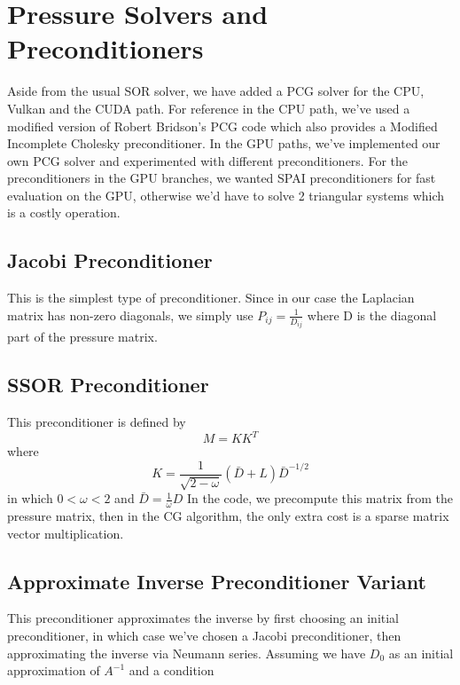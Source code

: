 \documentclass{article}
\begin{document}
\section{Pressure Solvers and Preconditioners}
Aside from the usual SOR solver, we have added a PCG solver for the CPU, Vulkan and the CUDA path. For reference in the CPU path, we've used a modified version of Robert Bridson's PCG code which also provides a Modified Incomplete Cholesky preconditioner. In the GPU paths, we've implemented our own PCG solver and experimented with different preconditioners. For the preconditioners in the GPU branches, we wanted SPAI preconditioners for fast evaluation on the GPU, otherwise we'd have to solve 2 triangular systems which is a costly operation.

\subsection{Jacobi Preconditioner}
This is the simplest type of preconditioner. Since in our case the Laplacian matrix has non-zero diagonals, we simply use $P_{ij} = \frac{1}{D_{ij}}$ where D is the diagonal part of the pressure matrix.

\subsection{SSOR Preconditioner}

This preconditioner \cite{helfenstein} is defined by 
\begin{equation}
M=K K^{T}
\end{equation}
where 
\begin{equation}
K=\frac{1}{\sqrt{2-\omega}}(\bar{D}+L) \bar{D}^{-1 / 2}
\end{equation}
in which $0 <  \omega < 2$ and $\bar{D} = \frac{1}{\omega}D$
In the code, we precompute this matrix from the pressure matrix, then in the CG algorithm, the only extra cost is a sparse matrix vector multiplication.

\subsection{Approximate Inverse Preconditioner Variant}
This preconditioner \cite{labutin} approximates the inverse by first choosing an initial preconditioner, in which case we've chosen a Jacobi preconditioner, then approximating
the inverse via Neumann series. Assuming we have $D_0$ as an initial approximation of $A^{-1}$ and a condition 
\end{document}
